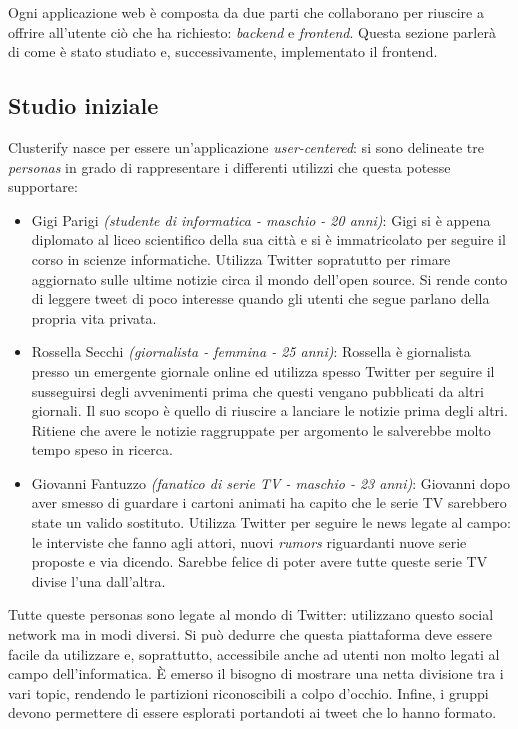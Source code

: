 Ogni applicazione web è composta da due parti che collaborano per riuscire a offrire all'utente ciò che ha richiesto: \emph{backend} e \emph{frontend}. Questa sezione parlerà di come è stato studiato e, successivamente, implementato il frontend.

\subsection{Studio iniziale}
	Clusterify nasce per essere un'applicazione \emph{user-centered}: si sono delineate tre \emph{personas} in grado di rappresentare i differenti utilizzi che questa potesse supportare:
	\begin{itemize}
		\item Gigi Parigi \emph{(studente di informatica - maschio - 20 anni)}: Gigi si è appena diplomato al liceo scientifico della sua città e si è immatricolato per seguire il corso in scienze informatiche. Utilizza Twitter sopratutto per rimare aggiornato sulle ultime notizie circa il mondo dell'open source. Si rende conto di leggere tweet di poco interesse quando gli utenti che segue parlano della propria vita privata.
		\item Rossella Secchi \emph{(giornalista - femmina - 25 anni)}: Rossella è giornalista presso un emergente giornale online ed utilizza spesso Twitter per seguire il susseguirsi degli avvenimenti prima che questi vengano pubblicati da altri giornali. Il suo scopo è quello di riuscire a lanciare le notizie prima degli altri. Ritiene che avere le notizie raggruppate per argomento le salverebbe molto tempo speso in ricerca.
		\item Giovanni Fantuzzo \emph{(fanatico di serie TV - maschio - 23 anni)}: Giovanni dopo aver smesso di guardare i cartoni animati ha capito che le serie TV sarebbero state un valido sostituto. Utilizza Twitter per seguire le news legate al campo: le interviste che fanno agli attori, nuovi \emph{rumors} riguardanti nuove serie proposte e via dicendo. Sarebbe felice di poter avere tutte queste serie TV divise l'una dall'altra.
	\end{itemize}

	Tutte queste personas sono legate al mondo di Twitter: utilizzano questo social network ma in modi diversi. Si può dedurre che questa piattaforma deve essere facile da utilizzare e, soprattutto, accessibile anche ad utenti non molto legati al campo dell'informatica. È emerso il bisogno di mostrare una netta divisione tra i vari topic, rendendo le partizioni riconoscibili a colpo d'occhio. Infine, i gruppi devono permettere di essere esplorati portandoti ai tweet che lo hanno formato.

